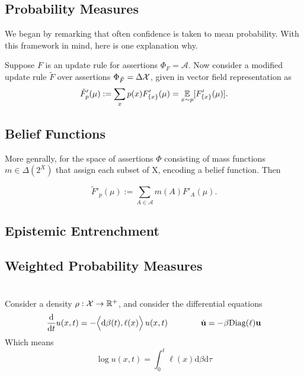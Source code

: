 \documentclass{article}
\begin{document}
\subsection{Probability Measures}

We began by remarking that often confidence is taken to mean probability.
With this framework in mind, here is one explanation why.

Suppose $F$ is an update rule for assertions $\Phi_F = \mathcal A$.
Now consider a modified update rule $\tilde F$ over assertions $\Phi_{\tilde F} = \Delta\mathcal X$, given in vector field representation as
\[
    \tilde F'_p(\mu) := \sum_{x} p(x) F'_{\{x\}}(\mu)
    = \operatorname*{\mathbb{E}}_{x \sim p} [ F'_{\{x\}} (\mu) ].
\]

\subsection{Belief Functions}
More genrally, for the space of assertions $\Phi$ consisting of mass functions $m \in \Delta(2^X)$ that assign each subset of X, encoding a belief function. Then

\[
    \tilde F'_p(\mu) := \sum_{A \in \mathcal A} m(A) F'_{A}(\mu).
\]




\subsection{Epistemic Entrenchment}
\subsection{Weighted Probability Measures}

\section{}
Consider a density $\rho : \mathcal X \to \mathbb R^+$, and consider the differential equations
\[
    \frac{\mathrm d}{\mathrm d t} u(x,t)
    = - \Big\langle\mathrm d\beta(t), \ell(x) \Big\rangle
        \,
        {u(x,t)}
    \qquad\qquad%
    \dot {\mat u} = - \beta \mathrm{Diag}(\ell) \mat u
\]
Which means
\[
        \log u (x,t)
    = \int_{0}^{t}  \ell(x) \mathrm d \beta \mathrm d \tau
\]
\end{document}

